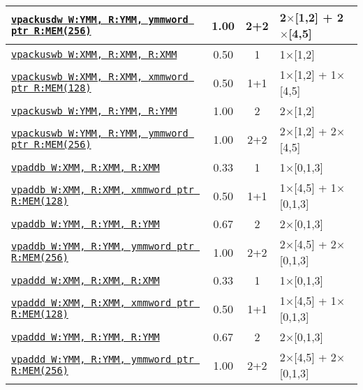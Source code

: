 \documentclass[a4paper,english,fontsize=9]{scrartcl}
\begin{document}
\begin{longtable}{p{}ccL{.25\textwidth}}
  \midrule
  \texttt{\href{https://felixcloutier.com/x86/PACKUSDW.html}{vpackusdw W:YMM, R:YMM, ymmword ptr R:MEM(256)}} & 1.00 & 2+2 & 2\(\times\)[1,2] + 2\(\times\)[4,5] \\
  \midrule
  \texttt{\href{https://felixcloutier.com/x86/PACKUSWB.html}{vpackuswb W:XMM, R:XMM, R:XMM}} & 0.50 & 1 & 1\(\times\)[1,2] \\
  \midrule
  \texttt{\href{https://felixcloutier.com/x86/PACKUSWB.html}{vpackuswb W:XMM, R:XMM, xmmword ptr R:MEM(128)}} & 0.50 & 1+1 & 1\(\times\)[1,2] + 1\(\times\)[4,5] \\
  \midrule
  \texttt{\href{https://felixcloutier.com/x86/PACKUSWB.html}{vpackuswb W:YMM, R:YMM, R:YMM}} & 1.00 & 2 & 2\(\times\)[1,2] \\
  \midrule
  \texttt{\href{https://felixcloutier.com/x86/PACKUSWB.html}{vpackuswb W:YMM, R:YMM, ymmword ptr R:MEM(256)}} & 1.00 & 2+2 & 2\(\times\)[1,2] + 2\(\times\)[4,5] \\
  \midrule
  \texttt{\href{https://felixcloutier.com/x86/PADDB:PADDW:PADDD:PADDQ.html}{vpaddb W:XMM, R:XMM, R:XMM}} & 0.33 & 1 & 1\(\times\)[0,1,3] \\
  \midrule
  \texttt{\href{https://felixcloutier.com/x86/PADDB:PADDW:PADDD:PADDQ.html}{vpaddb W:XMM, R:XMM, xmmword ptr R:MEM(128)}} & 0.50 & 1+1 & 1\(\times\)[4,5] + 1\(\times\)[0,1,3] \\
  \midrule
  \texttt{\href{https://felixcloutier.com/x86/PADDB:PADDW:PADDD:PADDQ.html}{vpaddb W:YMM, R:YMM, R:YMM}} & 0.67 & 2 & 2\(\times\)[0,1,3] \\
  \midrule
  \texttt{\href{https://felixcloutier.com/x86/PADDB:PADDW:PADDD:PADDQ.html}{vpaddb W:YMM, R:YMM, ymmword ptr R:MEM(256)}} & 1.00 & 2+2 & 2\(\times\)[4,5] + 2\(\times\)[0,1,3] \\
  \midrule
  \texttt{\href{https://felixcloutier.com/x86/PADDB:PADDW:PADDD:PADDQ.html}{vpaddd W:XMM, R:XMM, R:XMM}} & 0.33 & 1 & 1\(\times\)[0,1,3] \\
  \midrule
  \texttt{\href{https://felixcloutier.com/x86/PADDB:PADDW:PADDD:PADDQ.html}{vpaddd W:XMM, R:XMM, xmmword ptr R:MEM(128)}} & 0.50 & 1+1 & 1\(\times\)[4,5] + 1\(\times\)[0,1,3] \\
  \midrule
  \texttt{\href{https://felixcloutier.com/x86/PADDB:PADDW:PADDD:PADDQ.html}{vpaddd W:YMM, R:YMM, R:YMM}} & 0.67 & 2 & 2\(\times\)[0,1,3] \\
  \midrule
  \texttt{\href{https://felixcloutier.com/x86/PADDB:PADDW:PADDD:PADDQ.html}{vpaddd W:YMM, R:YMM, ymmword ptr R:MEM(256)}} & 1.00 & 2+2 & 2\(\times\)[4,5] + 2\(\times\)[0,1,3] \\

\end{longtable}
\end{document}
